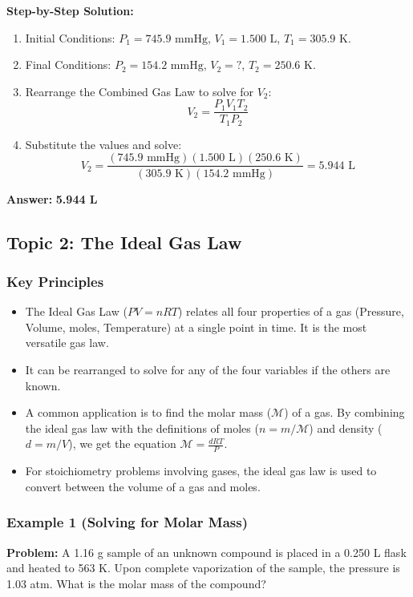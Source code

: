 \documentclass{article}
\begin{document}
\textbf{Step-by-Step Solution:}
\begin{enumerate}
    \item Initial Conditions: $P_1 = 745.9 \text{ mmHg}$, $V_1 = 1.500 \text{ L}$, $T_1 = 305.9 \text{ K}$.
    \item Final Conditions: $P_2 = 154.2 \text{ mmHg}$, $V_2 = ?$, $T_2 = 250.6 \text{ K}$.
    \item Rearrange the Combined Gas Law to solve for $V_2$:
    \[ V_2 = \frac{P_1 V_1 T_2}{T_1 P_2} \]
    \item Substitute the values and solve:
    \[ V_2 = \frac{(745.9 \text{ mmHg})(1.500 \text{ L})(250.6 \text{ K})}{(305.9 \text{ K})(154.2 \text{ mmHg})} = 5.944 \text{ L} \]
\end{enumerate}
\textbf{Answer:} \textbf{5.944 L}

\subsection{Topic 2: The Ideal Gas Law}
\subsubsection{Key Principles}
\begin{itemize}
    \item The Ideal Gas Law ($PV=nRT$) relates all four properties of a gas (Pressure, Volume, moles, Temperature) at a single point in time. It is the most versatile gas law.
    \item It can be rearranged to solve for any of the four variables if the others are known.
    \item A common application is to find the molar mass ($\mathcal{M}$) of a gas. By combining the ideal gas law with the definitions of moles ($n = m/\mathcal{M}$) and density ($d = m/V$), we get the equation $\mathcal{M} = \frac{dRT}{P}$.
    \item For stoichiometry problems involving gases, the ideal gas law is used to convert between the volume of a gas and moles.
\end{itemize}

\subsubsection{Example 1 (Solving for Molar Mass)}
\textbf{Problem:} A 1.16 g sample of an unknown compound is placed in a 0.250 L flask and heated to 563 K. Upon complete vaporization of the sample, the pressure is 1.03 atm. What is the molar mass of the compound?
\end{document}
